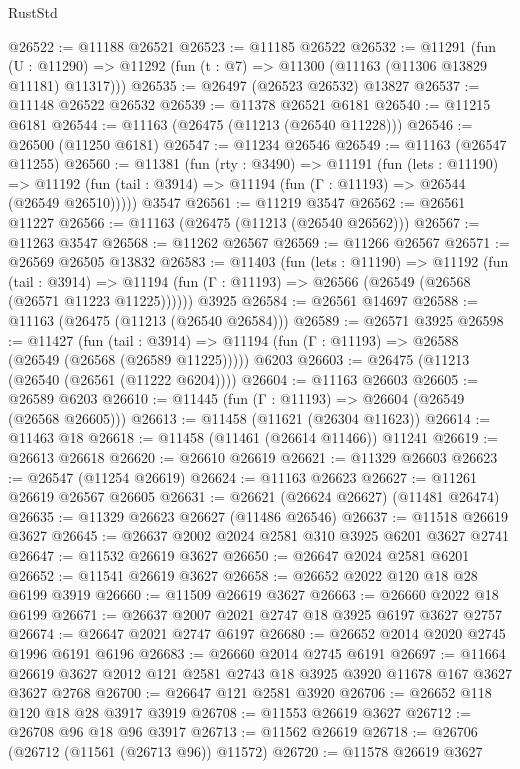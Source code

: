 \begin{lexlean}{RustStd}
\begin{coremodule}
@26522 := @11188 @26521
@26523 := @11185 @26522
@26532 := @11291
    (fun (U : @11290) => @11292 (fun (t : @7) => @11300 (@11163 (@11306 @13829 @11181) @11317)))
@26535 := @26497 (@26523 @26532) @13827
@26537 := @11148 @26522 @26532
@26539 := @11378 @26521 @6181
@26540 := @11215 @6181
@26544 := @11163 (@26475 (@11213 (@26540 @11228)))
@26546 := @26500 (@11250 @6181)
@26547 := @11234 @26546
@26549 := @11163 (@26547 @11255)
@26560 := @11381
    (fun (rty : @3490) =>
    @11191
      (fun (lets : @11190) =>
      @11192 (fun (tail : @3914) => @11194 (fun (Γ : @11193) => @26544 (@26549 @26510)))))
    @3547
@26561 := @11219 @3547
@26562 := @26561 @11227
@26566 := @11163 (@26475 (@11213 (@26540 @26562)))
@26567 := @11263 @3547
@26568 := @11262 @26567
@26569 := @11266 @26567
@26571 := @26569 @26505 @13832
@26583 := @11403
    (fun (lets : @11190) =>
    @11192
      (fun (tail : @3914) =>
      @11194 (fun (Γ : @11193) => @26566 (@26549 (@26568 (@26571 @11223 @11225))))))
    @3925
@26584 := @26561 @14697
@26588 := @11163 (@26475 (@11213 (@26540 @26584)))
@26589 := @26571 @3925
@26598 := @11427
    (fun (tail : @3914) => @11194 (fun (Γ : @11193) => @26588 (@26549 (@26568 (@26589 @11225)))))
    @6203
@26603 := @26475 (@11213 (@26540 (@26561 (@11222 @6204))))
@26604 := @11163 @26603
@26605 := @26589 @6203
@26610 := @11445 (fun (Γ : @11193) => @26604 (@26549 (@26568 @26605)))
@26613 := @11458 (@11621 (@26304 @11623))
@26614 := @11463 @18
@26618 := @11458 (@11461 (@26614 @11466)) @11241
@26619 := @26613 @26618
@26620 := @26610 @26619
@26621 := @11329 @26603
@26623 := @26547 (@11254 @26619)
@26624 := @11163 @26623
@26627 := @11261 @26619 @26567 @26605
@26631 := @26621 (@26624 @26627) (@11481 @26474)
@26635 := @11329 @26623 @26627 (@11486 @26546)
@26637 := @11518 @26619 @3627
@26645 := @26637 @2002 @2024 @2581 @310 @3925 @6201 @3627 @2741
@26647 := @11532 @26619 @3627
@26650 := @26647 @2024 @2581 @6201
@26652 := @11541 @26619 @3627
@26658 := @26652 @2022 @120 @18 @28 @6199 @3919
@26660 := @11509 @26619 @3627
@26663 := @26660 @2022 @18 @6199
@26671 := @26637 @2007 @2021 @2747 @18 @3925 @6197 @3627 @2757
@26674 := @26647 @2021 @2747 @6197
@26680 := @26652 @2014 @2020 @2745 @1996 @6191 @6196
@26683 := @26660 @2014 @2745 @6191
@26697 := @11664 @26619 @3627 @2012 @121 @2581 @2743 @18 @3925 @3920 @11678 @167 @3627 @3627 @2768
@26700 := @26647 @121 @2581 @3920
@26706 := @26652 @118 @120 @18 @28 @3917 @3919
@26708 := @11553 @26619 @3627
@26712 := @26708 @96 @18 @96 @3917
@26713 := @11562 @26619
@26718 := @26706 (@26712 (@11561 (@26713 @96)) @11572)
@26720 := @11578 @26619 @3627

\end{coremodule}
\end{lexlean}
